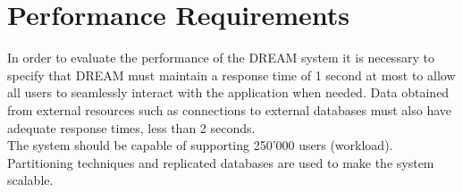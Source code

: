 \section{Performance Requirements}

In order to evaluate the performance of the DREAM system it is necessary to specify that DREAM must maintain a response time of 1 second at most to allow all users to seamlessly interact with the application when needed. Data obtained from external resources such as connections to external databases must also have adequate response times, less than 2 seconds.\\
The system should be capable of supporting 250'000 users (workload).\\
Partitioning techniques and replicated databases are used to make the system scalable.\\